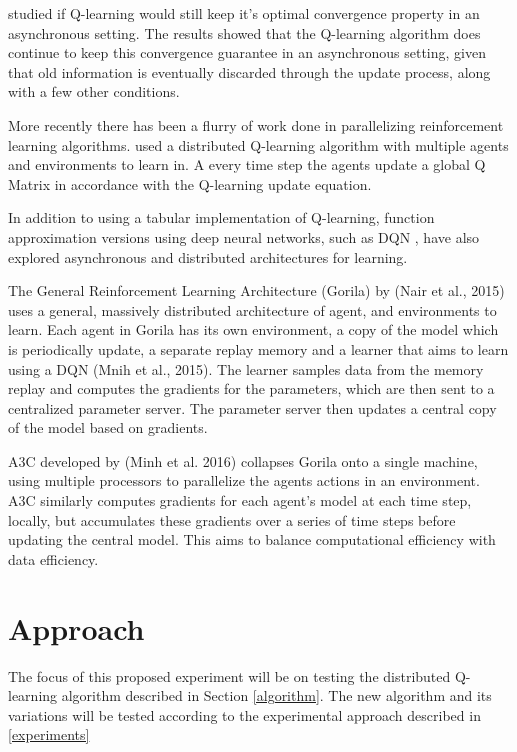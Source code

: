 \documentclass[jair,twoside,11pt,theapa]{article}
\begin{document}
\cite{Tsitsiklis1994} studied if Q-learning would still keep it's optimal convergence property in an asynchronous setting. The results showed that the Q-learning algorithm does continue to keep this convergence guarantee in an asynchronous setting, given that old information is eventually discarded through the update process, along with a few other conditions. 

More recently there has been a flurry of work done in parallelizing reinforcement learning algorithms. \cite{MANNION2015956} used a distributed Q-learning algorithm with multiple agents and environments to learn in. A every time step the agents update a global Q Matrix in accordance with the Q-learning update equation. 

In addition to using a tabular implementation of Q-learning, function approximation versions using deep neural networks, such as DQN \cite{Mnih2013}, have also explored asynchronous and distributed architectures for learning. 

The General Reinforcement Learning Architecture (Gorila) by (Nair et al., 2015) uses a general, massively distributed architecture of agent, and environments to learn. Each agent in Gorila has its own environment, a copy of the model which is periodically update, a separate replay memory and a learner that aims to learn using a DQN (Mnih et al., 2015). The learner samples data from the memory replay and computes the gradients for the parameters, which are then sent to a centralized parameter server. The parameter server then updates a central copy of the model based on gradients. 

A3C developed by (Minh et al. 2016) collapses Gorila onto a single machine, using multiple processors to parallelize the agents actions in an environment. A3C similarly computes gradients for each agent's model at each time step, locally, but accumulates these gradients over a series of time steps before updating the central model. This aims to balance computational efficiency with data efficiency. 


\section{Approach}
\label{Approach}
The focus of this proposed experiment will be on testing the distributed Q-learning algorithm described in Section \ref{algorithm}.
The new algorithm and its variations will be tested according to the experimental approach described in \ref{experiments}
\end{document}
